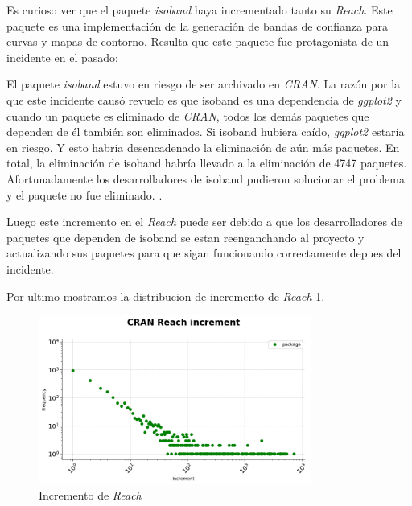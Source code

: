 Es curioso ver que el paquete \textit{isoband} haya incrementado tanto su \textit{Reach}.
Este paquete es una implementación de la generación de bandas de confianza para curvas y mapas de contorno.
Resulta que este paquete fue protagonista de un incidente en el pasado:

El paquete \textit{isoband} estuvo en riesgo de ser archivado en \textit{CRAN}. La razón por la que este incidente causó
revuelo es que isoband es una dependencia de \textit{ggplot2} y cuando un paquete es eliminado de \textit{CRAN}, todos los
demás paquetes que dependen de él también son eliminados. Si isoband hubiera caído, \textit{ggplot2} estaría en
riesgo. Y esto habría desencadenado la eliminación de aún más paquetes. En total, la eliminación de
isoband habría llevado a la eliminación de 4747 paquetes\cite{r-bloggers_isoband_incident}.
Afortunadamente los desarrolladores de isoband pudieron solucionar el problema y el paquete no fue eliminado.
\cite{isoband_issue}.

Luego este incremento en el \textit{Reach} puede ser debido a que los desarrolladores de paquetes que dependen de isoband
se estan reenganchando al proyecto y actualizando sus paquetes para que sigan funcionando correctamente depues del incidente.



Por ultimo mostramos la distribucion de incremento de \textit{Reach} \ref{fig:Incremento de Reach}.

\begin{figure}[ht!]
    \begin{center}
        \includegraphics[width=0.8\textwidth]{img/cran/reach_increment.png}
        \caption{Incremento de \textit{Reach}}
        \label{fig:Incremento de Reach}
    \end{center}
\end{figure}


\newpage

